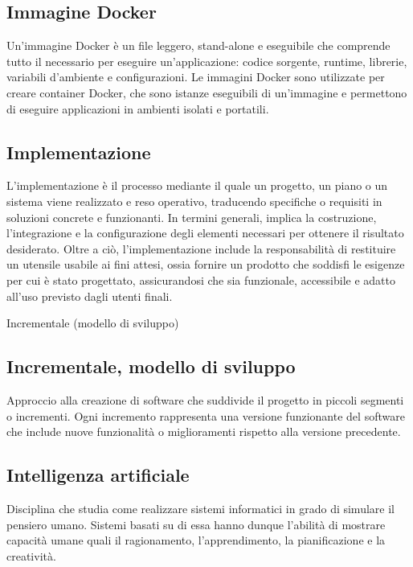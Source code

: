 \hypertarget{sec:immagine_docker}{}
\subsection*{Immagine Docker}
Un'immagine Docker è un file leggero, stand-alone e eseguibile che comprende tutto il necessario per eseguire un'applicazione: codice sorgente, runtime,
librerie, variabili d'ambiente e configurazioni. Le immagini Docker sono utilizzate per creare container Docker, che sono istanze eseguibili di un'immagine
e permettono di eseguire applicazioni in ambienti isolati e portatili.

\hypertarget{sec:implementazione}{}
\subsection*{Implementazione}
L'implementazione è il processo mediante il quale un progetto, un piano o un sistema viene realizzato e reso operativo, traducendo 
specifiche o requisiti in soluzioni concrete e funzionanti. In termini generali, implica la costruzione, l'integrazione e la 
configurazione degli elementi necessari per ottenere il risultato desiderato. Oltre a ciò, l'implementazione include la responsabilità 
di restituire un utensile usabile ai fini attesi, ossia fornire un prodotto che soddisfi le esigenze per cui è stato progettato, 
assicurandosi che sia funzionale, accessibile e adatto all'uso previsto dagli utenti finali.

\hypertarget{sec:modello_incrementale}{Incrementale (modello di sviluppo)}
\subsection*{Incrementale, modello di sviluppo}
Approccio alla creazione di software che suddivide il progetto in piccoli segmenti o incrementi. 
Ogni incremento rappresenta una versione funzionante del software che include nuove funzionalità o miglioramenti rispetto alla versione precedente.

\hypertarget{sec:intelligenza_artificiale}{}
\subsection*{Intelligenza artificiale}
Disciplina che studia come realizzare sistemi informatici in grado di simulare il pensiero umano. Sistemi basati su di essa hanno dunque l'abilità di mostrare 
capacità umane quali il ragionamento, l'apprendimento, la pianificazione e la creatività.

